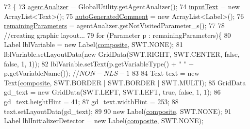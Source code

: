 \begin{DoxyCode}
72                                  \{
73         \hyperlink{classit_1_1isislab_1_1masonhelperdocumentation_1_1mason_1_1wizards_1_1_f___agent_variables_page_a6914bf26495bed37e500cc1ee50fdc50}{agentAnalizer} = GlobalUtility.getAgentAnalizer();  
74         \hyperlink{classit_1_1isislab_1_1masonhelperdocumentation_1_1mason_1_1wizards_1_1_f___agent_variables_page_a56e56862c30449ec5c07b8ac33d3b19f}{inputText} = \textcolor{keyword}{new} ArrayList<Text>();
75         \hyperlink{classit_1_1isislab_1_1masonhelperdocumentation_1_1mason_1_1wizards_1_1_f___agent_variables_page_a40035836d72bb86df98d0bb6035afb91}{autoGeneratedComment} = \textcolor{keyword}{new} ArrayList<Label>();
76         \hyperlink{classit_1_1isislab_1_1masonhelperdocumentation_1_1mason_1_1wizards_1_1_f___agent_variables_page_ade36fab1c0254d3ac94c077a06fb75f2}{remainingParameters} = agentAnalizer.getNotVisitedParameter\_s();
77         
78         \textcolor{comment}{//creating graphic layout...}
79         \textcolor{keywordflow}{for} (Parameter p : remainingParameters)\{
80             Label lblVariable = \textcolor{keyword}{new} Label(\hyperlink{classit_1_1isislab_1_1masonhelperdocumentation_1_1mason_1_1wizards_1_1_f___agent_variables_page_a9b95e0b06f6e0d96b7497478df0e5960}{composite}, SWT.NONE);
81             lblVariable.setLayoutData(\textcolor{keyword}{new} GridData(SWT.RIGHT, SWT.CENTER, \textcolor{keyword}{false}, \textcolor{keyword}{false}, 1, 1));
82             lblVariable.setText(p.getVariableType() + \textcolor{stringliteral}{" "} + p.getVariableName()); \textcolor{comment}{//$NON-NLS-1$}
83             
84             Text text = \textcolor{keyword}{new} Text(\hyperlink{classit_1_1isislab_1_1masonhelperdocumentation_1_1mason_1_1wizards_1_1_f___agent_variables_page_a9b95e0b06f6e0d96b7497478df0e5960}{composite}, SWT.BORDER | SWT.BORDER | SWT.MULTI);
85             GridData gd\_text = \textcolor{keyword}{new} GridData(SWT.LEFT, SWT.LEFT, \textcolor{keyword}{true}, \textcolor{keyword}{false}, 1, 1);
86             gd\_text.heightHint = 41;
87             gd\_text.widthHint = 253;
88             text.setLayoutData(gd\_text);
89 
90             \textcolor{keyword}{new} Label(\hyperlink{classit_1_1isislab_1_1masonhelperdocumentation_1_1mason_1_1wizards_1_1_f___agent_variables_page_a9b95e0b06f6e0d96b7497478df0e5960}{composite}, SWT.NONE);        
91             Label lblInitializerDetector = \textcolor{keyword}{new} Label(\hyperlink{classit_1_1isislab_1_1masonhelperdocumentation_1_1mason_1_1wizards_1_1_f___agent_variables_page_a9b95e0b06f6e0d96b7497478df0e5960}{composite}, SWT.NONE);

\end{DoxyCode}
